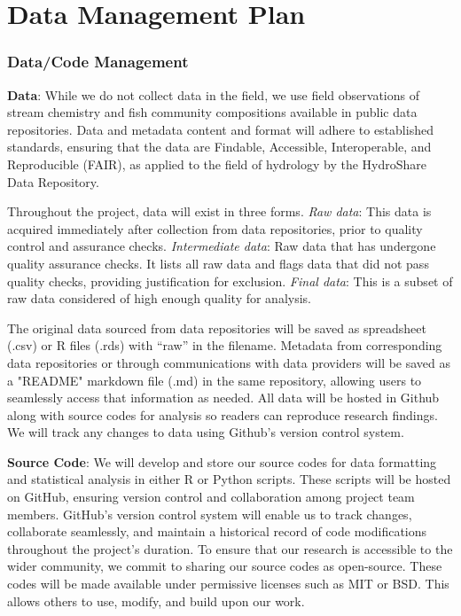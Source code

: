 \documentclass[12pt, class=article, crop=false]{standalone}
\begin{document}
\section*{Data Management Plan}

\subsubsection*{Data/Code Management}

\textbf{Data}: While we do not collect data in the field, we use field observations of stream chemistry and fish community compositions available in public data repositories. Data and metadata content and format will adhere to established standards, ensuring that the data are Findable, Accessible, Interoperable, and Reproducible (FAIR), as applied to the field of hydrology by the HydroShare Data Repository.

Throughout the project, data will exist in three forms.
\textit{Raw data}: This data is acquired immediately after collection from data repositories, prior to quality control and assurance checks.
\textit{Intermediate data}: Raw data that has undergone quality assurance checks.
It lists all raw data and flags data that did not pass quality checks, providing justification for exclusion.
\textit{Final data}: This is a subset of raw data considered of high enough quality for analysis.

The original data sourced from data repositories will be saved as spreadsheet (.csv) or R files (.rds) with ``raw'' in the filename.
Metadata from corresponding data repositories or through communications with data providers will be saved as a "README" markdown file (.md) in the same repository, allowing users to seamlessly access that information as needed.
All data will be hosted in Github along with source codes for analysis so readers can reproduce research findings.
We will track any changes to data using Github's version control system.

\textbf{Source Code}: We will develop and store our source codes for data formatting and statistical analysis in either R or Python scripts.
These scripts will be hosted on GitHub, ensuring version control and collaboration among project team members. 
GitHub's version control system will enable us to track changes, collaborate seamlessly, and maintain a historical record of code modifications throughout the project's duration.
To ensure that our research is accessible to the wider community, we commit to sharing our source codes as open-source. These codes will be made available under permissive licenses such as MIT or BSD. This allows others to use, modify, and build upon our work.
\end{document}
